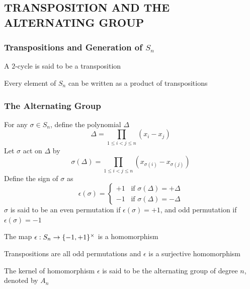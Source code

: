 \subsection{TRANSPOSITION AND THE ALTERNATING GROUP}

\subsubsection{Transpositions and Generation of $S_n$}

\begin{definition}[Transposition]
	A $2$-cycle is said to be a transposition
\end{definition}

\begin{proposition}
	Every element of $S_n$ can be written as a product of transpositions
\end{proposition}

\subsubsection{The Alternating Group}

\begin{definition}
	For any $\sigma \in S_n$, define the polynomial $\Delta$
	\[
	\Delta = \prod_{1 \leq i < j \leq n} (x_i - x_j)
	\]
	Let $\sigma$ act on $\Delta$ by
	\[
	\sigma(\Delta) = \prod_{1 \leq i < j \leq n} (x_{\sigma(i)} - x_{\sigma(j)})
	\]
	Define the sign of $\sigma$ as
	\[
	\epsilon(\sigma) = \begin{cases}
		+1 \;\;\;\text{if $\sigma(\Delta) = +\Delta$} \\
		-1 \;\;\;\text{if $\sigma(\Delta) = -\Delta$}
	\end{cases}
	\]
	$\sigma$ is said to be an even permutation if $\epsilon(\sigma) = +1$, and odd permutation if $\epsilon(\sigma) = -1$
\end{definition}

\begin{proposition}
	The map $\epsilon: S_n \to \{-1, +1\}^{\times}$ is a homomorphism
\end{proposition}

\begin{proposition}
	Transpositions are all odd permutations and $\epsilon$ is a surjective homomorphism
\end{proposition}

\begin{definition}
	The kernel of homomorphism $\epsilon$ is said to be the alternating group of degree $n$, denoted by $A_n$
\end{definition}

